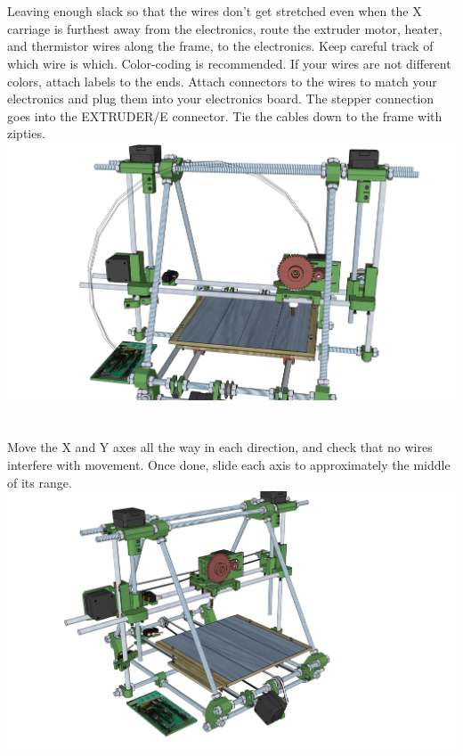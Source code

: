 \documentclass[twoside,openany,a4paper,titlepage]{memoir}
\begin{document}
	\section{}
	Leaving enough slack so that the wires don't get stretched even when the X carriage is furthest away
	from the electronics, route the extruder motor, heater, and thermistor wires along the frame, to the
	electronics. Keep careful track of which wire is which. Color-coding is recommended. If your wires are
	not different colors, attach labels to the ends. Attach connectors to the wires to match your electronics
	and plug them into your electronics board. The stepper connection goes into the EXTRUDER/E
	connector. Tie the cables down to the frame with zipties.\\
	\includegraphics[width=1\linewidth]{graphics/ch10_16.png}
	
	\section{}
	Move the X and Y axes all the way in each direction, and check that no wires interfere with movement.
	Once done, slide each axis to approximately the middle of its range.\\
	\includegraphics[width=1\linewidth]{graphics/ch10_17.png}
	
\end{document}
